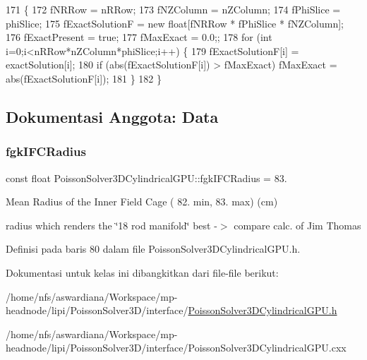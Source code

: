 \begin{DoxyCode}
171                                                                                                            
         \{
172     fNRRow = nRRow;
173     fNZColumn = nZColumn;
174     fPhiSlice = phiSlice;
175     fExactSolutionF = \textcolor{keyword}{new} \textcolor{keywordtype}{float}[fNRRow * fPhiSlice * fNZColumn];
176     fExactPresent = \textcolor{keyword}{true};
177     fMaxExact = 0.0;;
178     \textcolor{keywordflow}{for} (\textcolor{keywordtype}{int} i=0;i<nRRow*nZColumn*phiSlice;i++) \{
179         fExactSolutionF[i] = exactSolution[i];
180         \textcolor{keywordflow}{if} (abs(fExactSolutionF[i]) > fMaxExact) fMaxExact = abs(fExactSolutionF[i]); 
181     \}
182 \}
\end{DoxyCode}


\subsection{Dokumentasi Anggota\+: Data}
\hypertarget{classPoissonSolver3DCylindricalGPU_a6688ba03a837d4919001cd0aa14ef80e}{}\label{classPoissonSolver3DCylindricalGPU_a6688ba03a837d4919001cd0aa14ef80e} 
\subsubsection{\texorpdfstring{fgk\+I\+F\+C\+Radius}{fgkIFCRadius}}
{\footnotesize\ttfamily const float Poisson\+Solver3\+D\+Cylindrical\+G\+P\+U\+::fgk\+I\+F\+C\+Radius = 83.\hspace{0.3cm}{\ttfamily [static]}}



Mean Radius of the Inner Field Cage ( 82. min, 83. max) (cm) 

radius which renders the \char`\"{}18 rod manifold\char`\"{} best -\/$>$ compare calc. of Jim Thomas 

Definisi pada baris 80 dalam file Poisson\+Solver3\+D\+Cylindrical\+G\+P\+U.\+h.



Dokumentasi untuk kelas ini dibangkitkan dari file-\/file berikut\+:\begin{DoxyCompactItemize}
\item 
/home/nfs/aswardiana/\+Workspace/mp-\/headnode/lipi/\+Poisson\+Solver3\+D/interface/\hyperlink{PoissonSolver3DCylindricalGPU_8h}{Poisson\+Solver3\+D\+Cylindrical\+G\+P\+U.\+h}\item 
/home/nfs/aswardiana/\+Workspace/mp-\/headnode/lipi/\+Poisson\+Solver3\+D/interface/Poisson\+Solver3\+D\+Cylindrical\+G\+P\+U.\+cxx\end{DoxyCompactItemize}
